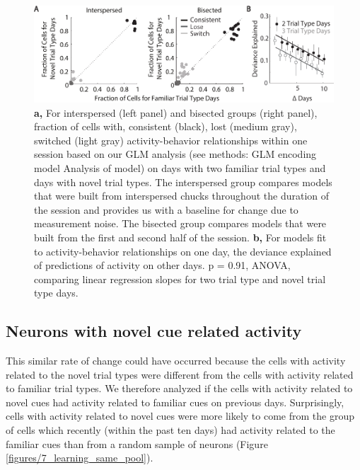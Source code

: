 \begin{figure}
\includegraphics[width=\textwidth]{figures/7_rate.pdf}
\caption[]{\textbf{a,} For interspersed (left panel) and bisected groups (right panel), fraction of cells with, consistent (black), lost (medium gray), switched (light gray) activity-behavior relationships within one session based on our GLM analysis (see methods: GLM encoding model Analysis of model)  on days with two familiar trial types and days with novel trial types. The interspersed group compares models that were built from interspersed chucks throughout the duration of the session and provides us with a baseline for change due to measurement noise. The bisected group compares models that were built from the first and second half of the session.
%
\textbf{b,} For models fit to activity-behavior relationships on one day, the deviance explained of predictions of activity on other days. p = 0.91, ANOVA, comparing linear regression slopes for two trial type and novel trial type days.
\label{fig:7_rate}}
\end{figure}

\subsection{Neurons with novel cue related activity} \label{chap4:novel_cue_pool}

This similar rate of change could have occurred because the cells with activity related to the novel trial types were different from the cells with activity related to familiar trial types. We therefore analyzed if the cells with activity related to novel cues had activity related to familiar cues on previous days. Surprisingly, cells with activity related to novel cues were more likely to come from the group of cells which recently (within the past ten days) had activity related to the familiar cues than from a random sample of neurons (Figure \ref{figures/7_learning_same_pool}). 


